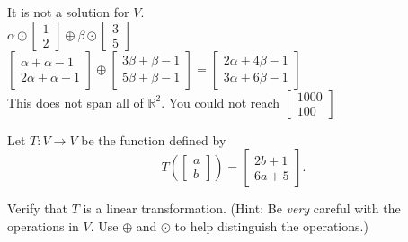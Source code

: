 		\begin{solution}
		    It is not a solution for $V$. \\
		    $\alpha\odot\begin{bmatrix}1\\2\end{bmatrix}\oplus\beta\odot\begin{bmatrix}3\\5\end{bmatrix}$
		    \\
		    $\begin{bmatrix}\alpha+\alpha-1 \\ 2\alpha+\alpha-1\end{bmatrix}\oplus
		    \begin{bmatrix}3\beta+\beta-1 \\ 5\beta+\beta-1\end{bmatrix} = 
		    \begin{bmatrix}2\alpha+4\beta-1 \\ 3\alpha+6\beta-1\end{bmatrix}$
		    \\
		    This does not span all of $\mathbb{R}^2$.  You could not reach $\begin{bmatrix}1000 \\ 100\end{bmatrix}$
		\end{solution}
		
		\item Let $T\colon V \to V$ be the function defined by
		\[
		T\left(\begin{bmatrix}a\\b\end{bmatrix}\right) =
		\begin{bmatrix} 2b+1 \\ 6a+5 \end{bmatrix}.
		\]
		
		Verify that $T$ is a linear transformation. (Hint: Be \textit{very} careful with the operations in $V$. Use $\oplus$ and $\odot$ to help distinguish the operations.)
		
